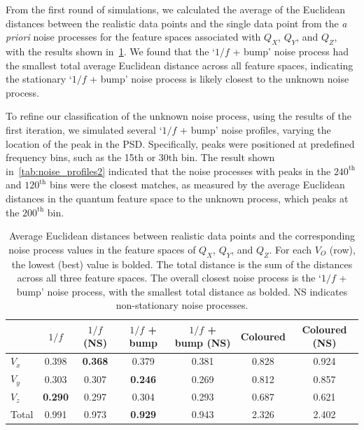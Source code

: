 \documentclass[12pt]{iopart}
\begin{document}
From the first round of simulations, we calculated the average of the Euclidean distances between the realistic data points and the single data point from the \textit{a priori} noise processes for the feature spaces associated with \(Q_X\), \(Q_Y\), and \(Q_Z\), with the results shown in~\cref{tab:noise_profiles}. We found that the `$1/f$ + bump' noise process had the smallest total average Euclidean distance across all feature spaces, indicating the stationary `$1/f$ + bump' noise process is likely closest to the unknown noise process.

To refine our classification of the unknown noise process, using the results of the first iteration, we simulated several `$1/f$ + bump' noise profiles, varying the location of the peak in the PSD. Specifically, peaks were positioned at predefined frequency bins, such as the 15th or 30th bin. The result shown in~\cref{tab:noise_profiles2} indicated that the noise processes with peaks in the $240^\mathrm{th}$ and $120^\mathrm{th}$ bins were the closest matches, as measured by the average Euclidean distances in the quantum feature space to the unknown process, which peaks at the $200^\mathrm{th}$ bin.

\begin{table}[ht]
    \centering
    \begin{tabular}{lcccccc}
        \toprule
              & $1/f$          & $1/f$ (NS)     & $1/f$ + bump   & $1/f$ + bump (NS) & Coloured & Coloured (NS) \\
        \midrule
        $V_x$ & 0.398          & \textbf{0.368} & 0.379          & 0.381             & 0.828    & 0.924         \\
        $V_y$ & 0.303          & 0.307          & \textbf{0.246} & 0.269             & 0.812    & 0.857         \\
        $V_z$ & \textbf{0.290} & 0.297          & 0.304          & 0.293             & 0.687    & 0.621         \\
        \midrule
 Total & 0.991          & 0.973          & \textbf{0.929} & 0.943             & 2.326    & 2.402         \\
        \bottomrule
    \end{tabular}
    \caption{Average Euclidean distances between realistic data points and the corresponding noise process values in the feature spaces of \(Q_X\), \(Q_Y\), and \(Q_Z\). For each \(V_O\) (row), the lowest (best) value is bolded. The total distance is the sum of the distances across all three feature spaces. The overall closest noise process is the `$1/f$ + bump' noise process, with the smallest total distance as bolded. NS indicates non-stationary noise processes.}
    \label{tab:noise_profiles}
\end{table}
\end{document}
